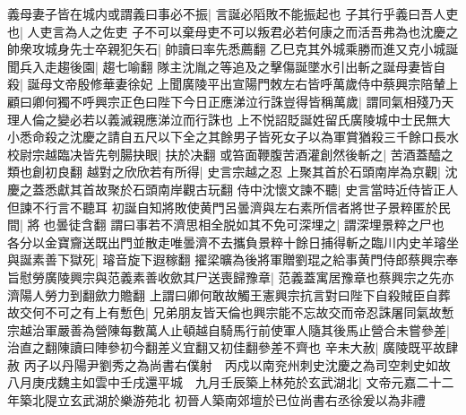 義母妻子皆在城内或謂義曰事必不振|{
	言誕必䧟敗不能振起也}
子其行乎義曰吾人吏也|{
	人吏言為人之佐吏}
子不可以棄母吏不可以叛君必若何康之而活吾弗為也沈慶之帥衆攻城身先士卒親犯矢石|{
	帥讀曰率先悉薦翻}
乙巳克其外城乘勝而進又克小城誕聞兵入走趨後園|{
	趨七喻翻}
隊主沈胤之等追及之擊傷誕墜水引出斬之誕母妻皆自殺|{
	誕母文帝殷修華妻徐妃}
上聞廣陵平出宣陽門敇左右皆呼萬歲侍中蔡興宗陪輦上顧曰卿何獨不呼興宗正色曰陛下今日正應涕泣行誅豈得皆稱萬歲|{
	謂同氣相殘乃天理人倫之變必若以義滅親應涕泣而行誅也}
上不悦詔貶誕姓留氏廣陵城中士民無大小悉命殺之沈慶之請自五尺以下全之其餘男子皆死女子以為軍賞猶殺三千餘口長水校尉宗越臨决皆先刳腸抉眼|{
	扶於决翻}
或笞面鞭腹苦酒灌創然後斬之|{
	苦酒蓋醯之類也創初良翻}
越對之欣欣若有所得|{
	史言宗越之忍}
上聚其首於石頭南岸為京觀|{
	沈慶之蓋悉獻其首故聚於石頭南岸觀古玩翻}
侍中沈懷文諫不聽|{
	史言當時近侍皆正人但諫不行言不聽耳}
初誕自知將敗使黄門呂曇濟與左右素所信者將世子景粹匿於民間|{
	將也曇徒含翻}
謂曰事若不濟思相全脱如其不免可深埋之|{
	謂深埋景粹之尸也}
各分以金寶齎送既出門並散走唯曇濟不去攜負景粹十餘日捕得斬之臨川内史羊璿坐與誕素善下獄死|{
	璿音旋下遐稼翻}
擢梁曠為後將軍贈劉琨之給事黄門侍郎蔡興宗奉旨慰勞廣陵興宗與范義素善收歛其尸送喪歸豫章|{
	范義蓋寓居豫章也蔡興宗之先亦濟陽人勞力到翻歛力贍翻}
上謂曰卿何敢故觸王憲興宗抗言對曰陛下自殺賊臣自葬故交何不可之有上有慙色|{
	兄弟朋友皆天倫也興宗能不忘故交而帝忍誅屠同氣故慙}
宗越治軍嚴善為營陳每數萬人止頓越自騎馬行前使軍人隨其後馬止營合未嘗參差|{
	治直之翻陳讀曰陣參初今翻差义宜翻又初佳翻參差不齊也}
辛未大赦|{
	廣陵既平故肆赦}
丙子以丹陽尹劉秀之為尚書右僕射　丙戍以南兖州刺史沈慶之為司空刺史如故　八月庚戌魏主如雲中壬戌還平城　九月壬辰築上林苑於玄武湖北|{
	文帝元嘉二十二年築北隄立玄武湖於樂游苑北}
初晉人築南郊壇於已位尚書右丞徐爰以為非禮

